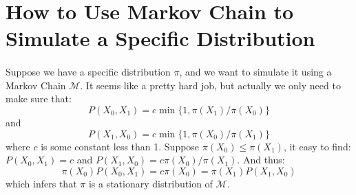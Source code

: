 \section{How to Use Markov Chain to Simulate a Specific Distribution}
\paragraph{} Suppose we have a specific distribution $\pi$, and we want to simulate it using a Markov Chain $\mathcal{M}$. It seems like a pretty hard job, but actually we only need to make sure that:
\[
  P(X_0, X_1) = c\min\{1, \pi(X_1)/\pi(X_0)\}
\] and
\[
  P(X_1, X_0) = c\min\{1, \pi(X_0)/\pi(X_1)\}
\]
where $c$ is some constant less than 1.
Suppose $\pi(X_0)\leq\pi(X_1)$, it easy to find:
$P(X_0, X_1) = c$ and $P(X_1, X_0) = c\pi(X_0)/\pi(X_1)$. And thus:
\[
  \pi(X_0)P(X_0,X_1) = c\pi(X_0) = \pi(X_1)P(X_1,X_0)
\] which infers that $\pi$ is a stationary distribution of $\mathcal{M}$.
